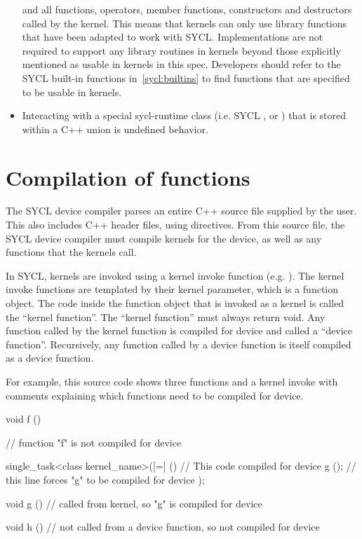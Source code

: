 \begin{itemize}
    and all functions, operators, member functions, constructors and destructors
    called by the kernel. This means that kernels can only use library functions
    that have been adapted to work with SYCL. Implementations are not required
    to support any library routines in kernels beyond those explicitly mentioned
    as usable in kernels in this spec. Developers should refer to the SYCL
    built-in functions in~\ref{sycl:builtins} to find functions that are
    specified to be usable in kernels.
  \item
     Interacting with a special \gls{sycl-runtime} class (i.e. SYCL ,  or ) that is stored within a C++ union is undefined behavior.
\end{itemize}

\section{Compilation of functions}

The SYCL device compiler parses an entire C++ source file supplied by the user.
This also includes C++ header files, using  directives. From this
source file, the SYCL device compiler must compile kernels for the device, as
well as any functions that the kernels call.

In SYCL, kernels are invoked using a kernel invoke function (e.g.
). The kernel invoke functions are templated by their
kernel parameter, which is a function object.
The code inside the function object that is invoked as a kernel is called
the ``kernel function''. The ``kernel function'' must always return void. Any
function called by the kernel function is compiled for device and called a
``device function''. Recursively, any function called by a device function is
itself compiled as a device function.

For example, this source code shows three functions and a kernel invoke with
comments explaining which functions need to be compiled for device.

\begin{code}
void f ()
{
    // function "f" is not compiled for device

    single_task<class kernel_name>([=] ()
        {
            // This code compiled for device
            g (); // this line forces "g" to be compiled for device
        });
}

void g ()
{
    // called from kernel, so "g" is compiled for device
}

void h ()
{
    // not called from a device function, so not compiled for device
}
\end{code}

